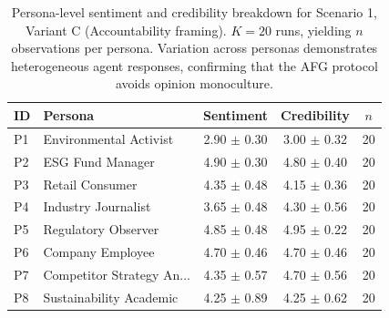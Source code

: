 \begin{table}[H]
\centering
\caption{Persona-level sentiment and credibility breakdown for Scenario 1, Variant C
(Accountability framing). $K=20$ runs, yielding $n$ observations per persona.
Variation across personas demonstrates heterogeneous agent responses,
confirming that the AFG protocol avoids opinion monoculture.}
\label{tab:persona_breakdown}
\small
\begin{tabular}{@{}llccc@{}}
\toprule
\textbf{ID} & \textbf{Persona} & \textbf{Sentiment} & \textbf{Credibility} & \textbf{$n$} \\
\midrule
    P1 & Environmental Activist & 2.90 $\pm$ 0.30 & 3.00 $\pm$ 0.32 & 20 \\
    P2 & ESG Fund Manager & 4.90 $\pm$ 0.30 & 4.80 $\pm$ 0.40 & 20 \\
    P3 & Retail Consumer & 4.35 $\pm$ 0.48 & 4.15 $\pm$ 0.36 & 20 \\
    P4 & Industry Journalist & 3.65 $\pm$ 0.48 & 4.30 $\pm$ 0.56 & 20 \\
    P5 & Regulatory Observer & 4.85 $\pm$ 0.48 & 4.95 $\pm$ 0.22 & 20 \\
    P6 & Company Employee & 4.70 $\pm$ 0.46 & 4.70 $\pm$ 0.46 & 20 \\
    P7 & Competitor Strategy An... & 4.35 $\pm$ 0.57 & 4.70 $\pm$ 0.56 & 20 \\
    P8 & Sustainability Academic & 4.25 $\pm$ 0.89 & 4.25 $\pm$ 0.62 & 20 \\
\bottomrule
\end{tabular}
\end{table}


